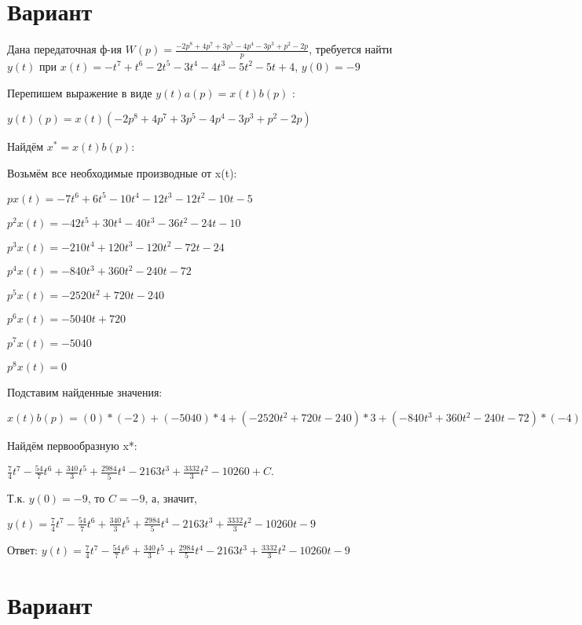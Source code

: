 \documentclass{article}
\begin{document}
{{{{{{\section{Вариант}

Дана передаточная ф-ия $W(p)=\frac{-2p^{8}+4p^{7}+3p^{5}-4p^{4}-3p^{3}+p^{2}-2p}{p}$, требуется найти $y(t)$ при $x(t)=-t^{7}+t^{6}-2t^{5}-3t^{4}-4t^{3}-5t^{2}-5t+4$, $y(0)=-9$

Перепишем выражение в виде $y(t)a(p)=x(t)b(p)$ :

$y(t)(p)=x(t)(-2p^{8}+4p^{7}+3p^{5}-4p^{4}-3p^{3}+p^{2}-2p)$

Найдём $x^*=x(t)b(p)$:

Возьмём все необходимые производные от x(t):

$px(t)=-7t^{6}+6t^{5}-10t^{4}-12t^{3}-12t^{2}-10t-5$

$p^2x(t)=-42t^{5}+30t^{4}-40t^{3}-36t^{2}-24t-10$

$p^3x(t)=-210t^{4}+120t^{3}-120t^{2}-72t-24$

$p^4x(t)=-840t^{3}+360t^{2}-240t-72$

$p^5x(t)=-2520t^{2}+720t-240$

$p^6x(t)=-5040t+720$

$p^7x(t)=-5040$

$p^8x(t)=0$

Подставим найденные значения:

$x(t)b(p) = (0)*(-2)+(-5040)*4+(-2520t^{2}+720t-240)*3+(-840t^{3}+360t^{2}-240t-72)*(-4)+(-210t^{4}+120t^{3}-120t^{2}-72t-24)*(-3)+(-42t^{5}+30t^{4}-40t^{3}-36t^{2}-24t-10)*1+(-7t^{6}+6t^{5}-10t^{4}-12t^{3}-12t^{2}-10t-5)*(-2)+=14t^{6}-54t^{5}+680t^{4}+2984t^{3}-8652t^{2}+3332t$





Найдём первообразную x*:

$\frac{7}{4}t^{7}-\frac{54}{7}t^{6}+\frac{340}{3}t^{5}+\frac{2984}{5}t^{4}-2163t^{3}+\frac{3332}{3}t^{2}-10260+C.$

Т.к. $y(0)=-9$, то $C=-9$, а, значит, 

$y(t)=\frac{7}{4}t^{7}-\frac{54}{7}t^{6}+\frac{340}{3}t^{5}+\frac{2984}{5}t^{4}-2163t^{3}+\frac{3332}{3}t^{2}-10260t-9$

Ответ: $y(t) = \frac{7}{4}t^{7}-\frac{54}{7}t^{6}+\frac{340}{3}t^{5}+\frac{2984}{5}t^{4}-2163t^{3}+\frac{3332}{3}t^{2}-10260t-9$

\section{Вариант}

}}}}}}
\end{document}
